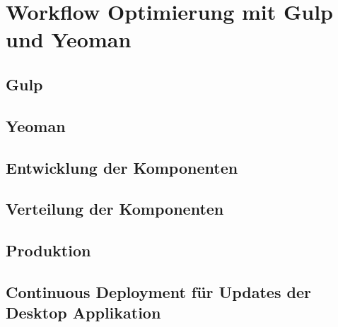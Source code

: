 
\chapter{Workflow Optimierung mit Gulp und Yeoman}
\label{chap:tooling}

\section{Gulp}
\section{Yeoman}

\section{Entwicklung der Komponenten}


\section{Verteilung der Komponenten}

\section{Produktion}

\section{Continuous Deployment für Updates der Desktop Applikation}
